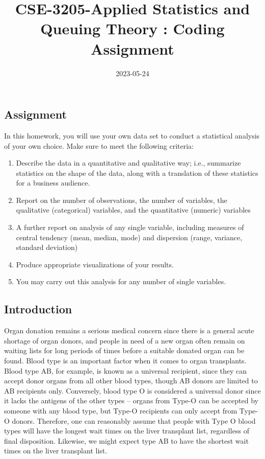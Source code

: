 \documentclass[
]{article}
\title{CSE-3205-Applied Statistics and Queuing Theory : Coding
Assignment}
\author{}
\date{\vspace{-2.5em}2023-05-24}
\begin{document}
\maketitle

\hypertarget{assignment}{%
\subsection{Assignment}\label{assignment}}

In this homework, you will use your own data set to conduct a
statistical analysis of your own choice. Make sure to meet the following
criteria:

\begin{enumerate}
\def\labelenumi{\arabic{enumi}.}
\item
  Describe the data in a quantitative and qualitative way; i.e.,
  summarize statistics on the shape of the data, along with a
  translation of these statistics for a business audience.
\item
  Report on the number of observations, the number of variables, the
  qualitative (categorical) variables, and the quantitative (numeric)
  variables
\item
  A further report on analysis of any single variable, including
  measures of central tendency (mean, median, mode) and dispersion
  (range, variance, standard deviation)
\item
  Produce appropriate visualizations of your results.
\item
  You may carry out this analysis for any number of single variables.
\end{enumerate}

\hypertarget{introduction}{%
\subsection{Introduction}\label{introduction}}

Organ donation remains a serious medical concern since there is a
general acute shortage of organ donors, and people in need of a new
organ often remain on waiting lists for long periods of times before a
suitable donated organ can be found. Blood type is an important factor
when it comes to organ transplants. Blood type AB, for example, is known
as a universal recipient, since they can accept donor organs from all
other blood types, though AB donors are limited to AB recipients only.
Conversely, blood type O is considered a universal donor since it lacks
the antigens of the other types -- organs from Type-O can be accepted by
someone with any blood type, but Type-O recipients can only accept from
Type-O donors. Therefore, one can reasonably assume that people with
Type O blood types will have the longest wait times on the liver
transplant list, regardless of final disposition. Likewise, we might
expect type AB to have the shortest wait times on the liver transplant
list.
\end{document}
